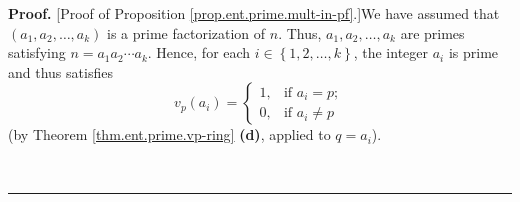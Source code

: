 \documentclass[numbers=enddot,12pt,final,onecolumn,notitlepage]{scrartcl}%
\numberwithin{exer}{subsection}
\theoremstyle{definition}
\newenvironment{proof}[1][Proof]{\noindent\textbf{#1.} }{\ \rule{0.5em}{0.5em}}
\begin{document}
\begin{proof}
[Proof of Proposition \ref{prop.ent.prime.mult-in-pf}.]We have assumed that
$\left(  a_{1},a_{2},\ldots,a_{k}\right)  $ is a prime factorization of $n$.
Thus, $a_{1},a_{2},\ldots,a_{k}$ are primes satisfying $n=a_{1}a_{2}\cdots
a_{k}$. Hence, for each $i\in\left\{  1,2,\ldots,k\right\}  $, the integer
$a_{i}$ is prime and thus satisfies%
\begin{equation}
v_{p}\left(  a_{i}\right)  =%
\begin{cases}
1, & \text{if }a_{i}=p;\\
0, & \text{if }a_{i}\neq p
\end{cases}
\label{pf.prop.ent.prime.mult-in-pf.1}%
\end{equation}
(by Theorem \ref{thm.ent.prime.vp-ring} \textbf{(d)}, applied to $q=a_{i}$).


\end{proof}
\end{document}
